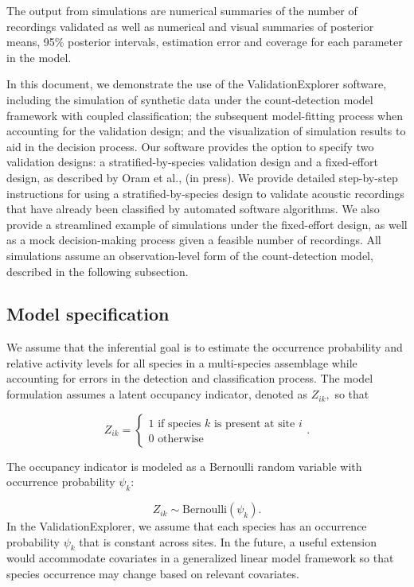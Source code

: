 \documentclass[
]{article}
\begin{document}
The output from simulations are numerical summaries of the number of recordings validated as well as numerical and visual summaries of posterior means, 95\% posterior intervals, estimation error and coverage for each parameter in the model.

In this document, we demonstrate the use of the ValidationExplorer software, including the simulation of synthetic data under the count-detection model framework with coupled classification; the subsequent model-fitting process when accounting for the validation design; and the visualization of simulation results to aid in the decision process. Our software provides the option to specify two validation designs: a stratified-by-species validation design and a fixed-effort design, as described by Oram et al., (in press). We provide detailed step-by-step instructions for using a stratified-by-species design to validate acoustic recordings that have already been classified by automated software algorithms. We also provide a streamlined example of simulations under the fixed-effort design, as well as a mock decision-making process given a feasible number of recordings. All simulations assume an observation-level form of the count-detection model, described in the following subsection.

\hypertarget{model}{%
\subsection{Model specification}\label{model}}

We assume that the inferential goal is to estimate the occurrence probability and relative activity levels for all species in a multi-species assemblage while accounting for errors in the detection and classification process. The model formulation assumes a latent occupancy indicator, denoted as \(Z_{ik},\) so that

\[Z_{ik}=
\begin{cases}
  1 \text{ if species }k\text{ is present at site } i \\
  0 \text{ otherwise }
\end{cases}.
\]

The occupancy indicator is modeled as a Bernoulli random variable with occurrence probability \(\psi_{k}\):

\[Z_{ik} \sim \text{Bernoulli}(\psi_{k}).\] In the ValidationExplorer, we assume that each species has an occurrence probability \(\psi_k\) that is constant across sites. In the future, a useful extension would accommodate covariates in a generalized linear model framework so that species occurrence may change based on relevant covariates.
\end{document}
